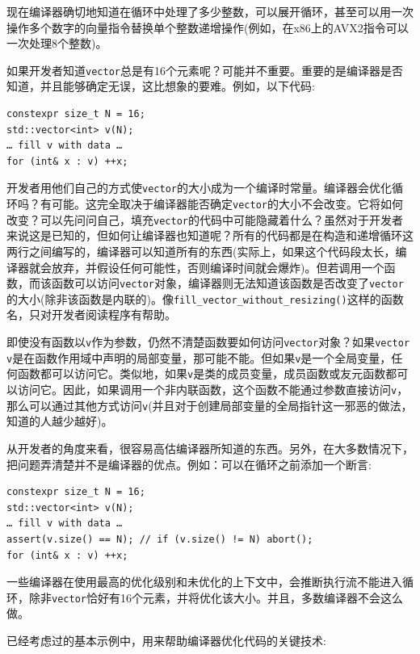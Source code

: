 现在编译器确切地知道在循环中处理了多少整数，可以展开循环，甚至可以用一次操作多个数字的向量指令替换单个整数递增操作(例如，在x86上的AVX2指令可以一次处理8个整数)。 

如果开发者知道\texttt{vector}总是有16个元素呢？可能并不重要。重要的是编译器是否知道，并且能够确定无误，这比想象的要难。例如，以下代码:

\begin{lstlisting}[style=styleCXX]
constexpr size_t N = 16;
std::vector<int> v(N);
… fill v with data … 
for (int& x : v) ++x;
\end{lstlisting}

开发者用他们自己的方式使\texttt{vector}的大小成为一个编译时常量。编译器会优化循环吗？有可能。这完全取决于编译器能否确定\texttt{vector}的大小不会改变。它将如何改变？可以先问问自己，填充\texttt{vector}的代码中可能隐藏着什么？虽然对于开发者来说这是已知的，但如何让编译器也知道呢？所有的代码都是在构造和递增循环这两行之间编写的，编译器可以知道所有的东西(实际上，如果这个代码段太长，编译器就会放弃，并假设任何可能性，否则编译时间就会爆炸)。但若调用一个函数，而该函数可以访问\texttt{vector}对象，编译器则无法知道该函数是否改变了\texttt{vector}的大小(除非该函数是内联的)。像\texttt{fill\_vector\_without\_resizing()}这样的函数名，只对开发者阅读程序有帮助。 

即使没有函数以\texttt{v}作为参数，仍然不清楚函数要如何访问\texttt{vector}对象？如果\texttt{vector v}是在函数作用域中声明的局部变量，那可能不能。但如果\texttt{v}是一个全局变量，任何函数都可以访问它。类似地，如果\texttt{v}是类的成员变量，成员函数或友元函数都可以访问它。因此，如果调用一个非内联函数，这个函数不能通过参数直接访问\texttt{v}，那么可以通过其他方式访问\texttt{v}(并且对于创建局部变量的全局指针这一邪恶的做法，知道的人越少越好)。 

从开发者的角度来看，很容易高估编译器所知道的东西。另外，在大多数情况下，把问题弄清楚并不是编译器的优点。例如：可以在循环之前添加一个断言:

\begin{lstlisting}[style=styleCXX]
constexpr size_t N = 16;
std::vector<int> v(N);
… fill v with data … 
assert(v.size() == N); // if (v.size() != N) abort();
for (int& x : v) ++x;
\end{lstlisting}

一些编译器在使用最高的优化级别和未优化的上下文中，会推断执行流不能进入循环，除非\texttt{vector}恰好有16个元素，并将优化该大小。并且，多数编译器不会这么做。

已经考虑过的基本示例中，用来帮助编译器优化代码的关键技术:

